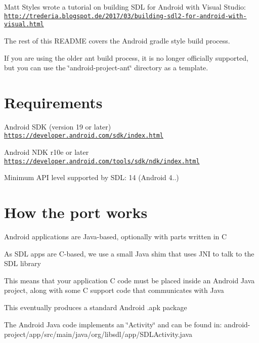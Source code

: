 Matt Styles wrote a tutorial on building S\+DL for Android with Visual Studio\+: \href{http://trederia.blogspot.de/2017/03/building-sdl2-for-android-with-visual.html}{\tt http\+://trederia.\+blogspot.\+de/2017/03/building-\/sdl2-\/for-\/android-\/with-\/visual.\+html}

The rest of this R\+E\+A\+D\+ME covers the Android gradle style build process.

If you are using the older ant build process, it is no longer officially supported, but you can use the \char`\"{}android-\/project-\/ant\char`\"{} directory as a template.



 \section*{Requirements }

Android S\+DK (version 19 or later) \href{https://developer.android.com/sdk/index.html}{\tt https\+://developer.\+android.\+com/sdk/index.\+html}

Android N\+DK r10e or later \href{https://developer.android.com/tools/sdk/ndk/index.html}{\tt https\+://developer.\+android.\+com/tools/sdk/ndk/index.\+html}

Minimum A\+PI level supported by S\+DL\+: 14 (Android 4..)



 \section*{How the port works }


\begin{DoxyItemize}
\item Android applications are Java-\/based, optionally with parts written in C
\item As S\+DL apps are C-\/based, we use a small Java shim that uses J\+NI to talk to the S\+DL library
\item This means that your application C code must be placed inside an Android Java project, along with some C support code that communicates with Java
\item This eventually produces a standard Android .apk package
\end{DoxyItemize}

The Android Java code implements an \char`\"{}\+Activity\char`\"{} and can be found in\+: android-\/project/app/src/main/java/org/libsdl/app/\+S\+D\+L\+Activity.\+java

